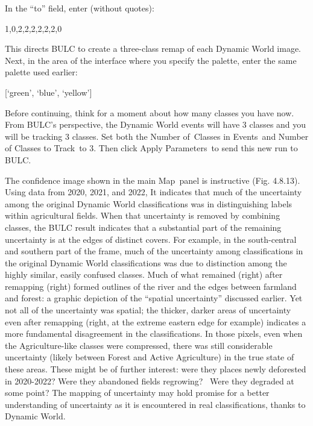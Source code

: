 \documentclass[
  letterpaper,
  DIV=11,
  numbers=noendperiod]{scrreprt}
\begin{document}
In the ``to'' field, enter (without quotes):

1,0,2,2,2,2,2,2,0

This directs BULC to create a three-class remap of each Dynamic World
image. Next, in the area of the interface where you specify the palette,
enter the same palette used earlier:

{[}`green', `blue', `yellow'{]}

Before continuing, think for a moment about how many classes you have
now. From BULC's perspective, the Dynamic World events will have 3
classes and you will be tracking 3 classes. Set both the Number
of~Classes in Events~and Number of Classes to Track~to 3. Then click
Apply Parameters~to send this new run to BULC.

The confidence image shown in the main Map~panel is instructive (Fig.
4.8.13). Using data from 2020, 2021, and 2022, It indicates that much of
the uncertainty among the original Dynamic World classifications was in
distinguishing labels within agricultural fields. When that uncertainty
is removed by combining classes, the BULC result indicates that a
substantial part of the remaining uncertainty is at the edges of
distinct covers. For example, in the south-central and southern part of
the frame, much of the uncertainty among classifications in the original
Dynamic World classifications was due to distinction among the highly
similar, easily confused classes. Much of what remained (right) after
remapping (right) formed outlines of the river and the edges between
farmland and forest: a graphic depiction of the ``spatial uncertainty''
discussed earlier. Yet not all of the uncertainty was spatial; the
thicker, darker areas of uncertainty even after remapping (right, at the
extreme eastern edge for example) indicates a more fundamental
disagreement in the classifications. In those pixels, even when the
Agriculture-like classes were compressed, there was still considerable
uncertainty (likely between Forest and Active Agriculture) in the true
state of these areas. These might be of further interest: were they
places newly deforested in 2020-2022? Were they abandoned fields
regrowing? ~Were they degraded at some point? The mapping of uncertainty
may hold promise for a better understanding of uncertainty as it is
encountered in real classifications, thanks to Dynamic World.
\end{document}
